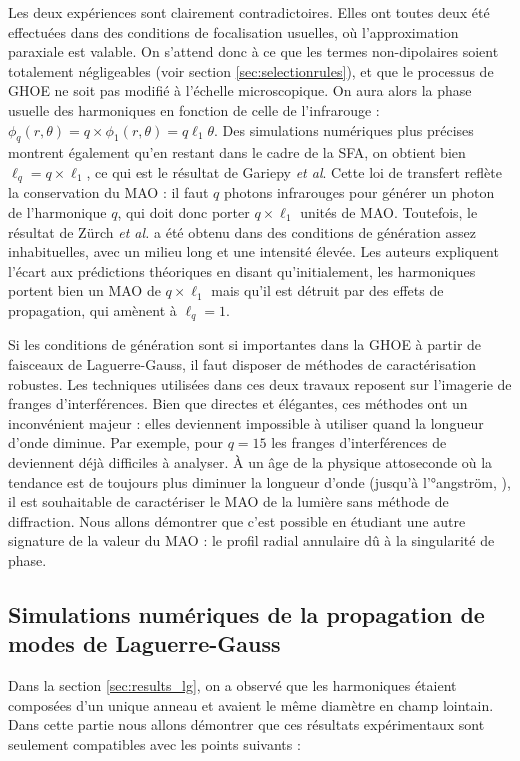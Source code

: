 Les deux expériences sont clairement contradictoires. Elles ont toutes deux été effectuées dans des conditions de focalisation usuelles, où l'approximation paraxiale est valable. On s'attend donc à ce que les termes non-dipolaires soient totalement négligeables (voir section \ref{sec:selectionrules}), et que le processus de GHOE ne soit pas modifié à l'échelle microscopique. On aura alors la phase usuelle des harmoniques en fonction de celle de l'infrarouge : $\phi_q(r,\theta) = q\times\phi_1(r,\theta) = q\ell_1\theta$. Des simulations numériques plus précises  montrent également qu'en restant dans le cadre de la SFA, on obtient bien $\ell_{q}=q\times\ell_1$, ce qui est le résultat de Gariepy \textit{et al}. Cette loi de transfert reflète la conservation du MAO : il faut $q$ photons infrarouges pour générer un photon de l'harmonique $q$, qui doit donc porter $q\times\ell_1$ unités de MAO.
Toutefois, le résultat de Zürch \textit{et al.} a été obtenu dans des conditions de génération assez inhabituelles, avec un milieu long et une intensité élevée. Les auteurs expliquent l'écart aux prédictions théoriques en disant qu'initialement, les harmoniques portent bien un MAO de $q\times\ell_1$ mais qu'il est détruit par des effets de propagation, qui amènent à $\ell_q = 1$.

Si les conditions de génération sont si importantes dans la GHOE à partir de faisceaux de Laguerre-Gauss, il faut disposer de méthodes de caractérisation robustes. Les techniques utilisées dans ces deux travaux reposent sur l'imagerie de franges d'interférences. Bien que directes et élégantes, ces méthodes ont un inconvénient majeur : elles deviennent impossible à utiliser quand la longueur d'onde diminue. Par exemple, pour $q=15$ les franges d'interférences de  deviennent déjà difficiles à analyser. \`{A} un âge de la physique attoseconde où la tendance est de toujours plus diminuer la longueur d'onde (jusqu'à l'°angström, ), il est souhaitable de caractériser le MAO de la lumière sans méthode de diffraction. Nous allons démontrer que c'est possible en étudiant une autre signature de la valeur du MAO : le profil radial annulaire dû à la singularité de phase.

\subsection{Simulations numériques de la propagation de modes de Laguerre-Gauss}
Dans la section \ref{sec:results_lg}, on a observé que les harmoniques étaient composées d'un unique anneau et avaient le même diamètre en champ lointain. Dans cette partie nous allons démontrer que ces résultats expérimentaux sont seulement compatibles avec les points suivants :

